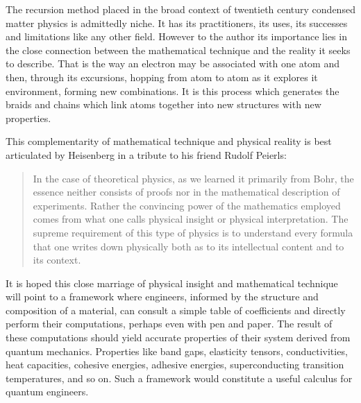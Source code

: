 The recursion method placed in the broad context of twentieth century 
condensed matter physics is admittedly niche. It has its practitioners, 
its uses, its successes and limitations like any other field.
However to the author its importance lies in the close connection between the mathematical
technique and the reality it seeks to describe. That is the way 
an electron may be associated with 
one atom and then, through its excursions, hopping from atom to atom as it explores 
it environment, forming new combinations. It is this process which
generates the braids and chains which link atoms together into new structures 
with new properties.

%

This complementarity of mathematical technique and physical reality 
is best articulated by Heisenberg in a tribute to his friend Rudolf Peierls:
 
\begin{quote}
In the case of theoretical physics, as we learned it primarily from
Bohr, the essence neither consists of proofs
nor in the mathematical description of experiments.
Rather the convincing power of the mathematics employed comes from
what one calls physical insight or physical interpretation. The supreme
requirement of this type of physics is to understand every formula that
one writes down physically both as to its intellectual content and to its context.
\end{quote}
 
It is hoped this close marriage of physical insight and mathematical technique
will point to a framework where engineers, informed by the
structure and composition of a material, can consult a simple table of
coefficients and directly perform their computations, perhaps even with 
pen and paper. The result of these computations should yield accurate 
properties of their system derived from quantum mechanics.
Properties like band gaps, elasticity tensors, conductivities, 
heat capacities, cohesive energies, adhesive energies, superconducting transition temperatures, 
and so on. Such a framework would constitute a useful calculus for quantum engineers.

